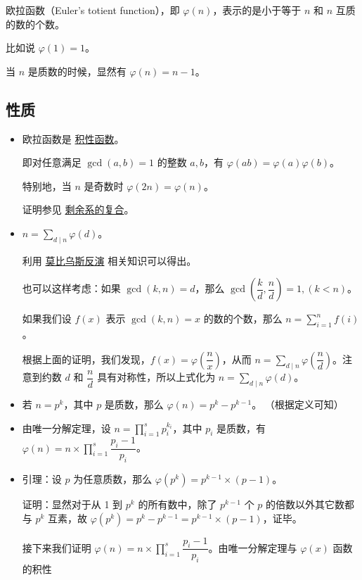 欧拉函数（Euler's totient function），即 \(\varphi(n)\)，表示的是小于等于 \(n\) 和 \(n\) 互质的数的个数。

比如说 \(\varphi(1) = 1\)。

当 \(n\) 是质数的时候，显然有 \(\varphi(n) = n - 1\)。

\subsection{性质}\label{ux6027ux8d28}

\begin{itemize}
\item
  欧拉函数是 \href{./basic.md\#积性函数}{积性函数}。

  即对任意满足 \(\gcd(a, b) = 1\) 的整数 \(a,b\)，有 \(\varphi(ab) = \varphi(a)\varphi(b)\)。

  特别地，当 \(n\) 是奇数时 \(\varphi(2n) = \varphi(n)\)。

  证明参见 \href{./basic.md\#剩余系的复合}{剩余系的复合}。
\item
  \(n = \sum_{d \mid n}{\varphi(d)}\)。

  利用 \href{./mobius.md}{莫比乌斯反演} 相关知识可以得出。

  也可以这样考虑：如果 \(\gcd(k, n) = d\)，那么 \(\gcd(\dfrac{k}{d},\dfrac{n}{d}) = 1, ( k < n )\)。

  如果我们设 \(f(x)\) 表示 \(\gcd(k, n) = x\) 的数的个数，那么 \(n = \sum_{i = 1}^n{f(i)}\)。

  根据上面的证明，我们发现，\(f(x) = \varphi(\dfrac{n}{x})\)，从而 \(n = \sum_{d \mid n}\varphi(\dfrac{n}{d})\)。注意到约数 \(d\) 和 \(\dfrac{n}{d}\) 具有对称性，所以上式化为 \(n = \sum_{d \mid n}\varphi(d)\)。
\item
  若 \(n = p^k\)，其中 \(p\) 是质数，那么 \(\varphi(n) = p^k - p^{k - 1}\)。 （根据定义可知）
\item
  由唯一分解定理，设 \(n = \prod_{i=1}^{s}p_i^{k_i}\)，其中 \(p_i\) 是质数，有 \(\varphi(n) = n \times \prod_{i = 1}^s{\dfrac{p_i - 1}{p_i}}\)。
\item
  引理：设 \(p\) 为任意质数，那么 \(\varphi(p^k)=p^{k-1}\times(p-1)\)。

  证明：显然对于从 1 到 \(p^k\) 的所有数中，除了 \(p^{k-1}\) 个 \(p\) 的倍数以外其它数都与 \(p^k\) 互素，故 \(\varphi(p^k)=p^k-p^{k-1}=p^{k-1}\times(p-1)\)，证毕。

  接下来我们证明 \(\varphi(n) = n \times \prod_{i = 1}^s{\dfrac{p_i - 1}{p_i}}\)。由唯一分解定理与 \(\varphi(x)\) 函数的积性


\end{itemize}
